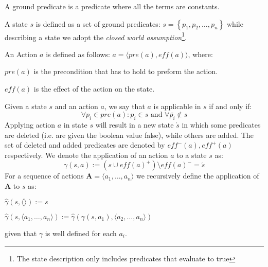 \begin{Tdef}
    A ground predicate is a predicate where all the terms are constants.
\end{Tdef}
    
\begin{Tdef}[State]
    A state $s$ is defined as a set of ground predicates: $s = \left\{ p_1, p_2, \dots, p_n\right\}$
    while describing a state we adopt the \textit{closed world assumption}\footnote{The state description only includes predicates that evaluate to true}.
\end{Tdef}
    
\begin{Tdef}[Action]
    An Action $a$ is defined as follows: $a = \langle pre(a), eff(a) \rangle$, where:
    \vspace{-0.5em}
    \begin{compactitem}
    \item 
    $pre(a)$ is the precondition that has to hold to preform the action.
    \item 
    $eff(a)$ is the effect of the action on the state.
    \end{compactitem}
\end{Tdef}

\begin{Tdef}
    Given a state $s$ and an action $a$, we say that $a$ is applicable in $s$ 
    if and only if:
    \vspace{-0.5em}
    $$\forall p_i \in pre(a): p_i\in s \text{ and } \forall \bar{p_i} \notin s$$
    Applying action $a$ in state $s$ will result in a new state $\acute{s}$
    in which some predicates are deleted 
    (i.e. are given the boolean value false), while others are added.
    The set of deleted and added predicates are denoted by $eff^-(a), eff^+(a)$ respectively.
    We denote the application of an action $a$ to a state $s$ as:
    \vspace{-0.5em}
    $$\gamma(s,a) := (s \cup eff(a)^+) \setminus eff(a)^- = \acute{s}$$
    For a sequence of actions $\mathbf{A} = \langle a_1,\dots,a_n \rangle$ we recursively define 
    the application of $\mathbf{A}$ to $s$ as:
    \vspace{-0.5em}
    \begin{compactitem}
    \item 
    $\hat{\gamma}(s,\langle \rangle) := s$
    \item 
    $\hat{\gamma}(s,\langle a_1,\dots,a_n\rangle) := \hat{\gamma}(\gamma(s,a_1),\langle a_2,\dots,a_n\rangle)$
    \end{compactitem}
    given that $\gamma$ is well defined for each $a_i$.
\end{Tdef}


